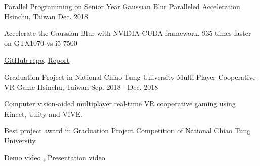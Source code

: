 \begin{cventries}
\cventry
    {Parallel Programming on Senior Year} %
    {Gaussian Blur Paralleled Acceleration} %
    {Hsinchu, Taiwan} %
    {Dec. 2018} %
    {
      \begin{cvitems} %
        \item Accelerate the Gaussian Blur with NVIDIA CUDA framework. 935 times faster on GTX1070 vs i5 7500
        \item \href{https://github.com/Alfons0329/Parallel_Programming_Fall_2018/tree/master/Final\%20Project}{GitHub repo}, \href{https://github.com/Alfons0329/Parallel_Programming_Fall_2018/blob/master/Final\%20Project/Team24_Final_Project_Report.pdf}{Report}
      \end{cvitems}
    }
\cventry
    {Graduation Project in National Chiao Tung University} %
    {Multi-Player Cooperative VR Game} %
    {Hsinchu, Taiwan} %
    {Sep. 2018 - Dec. 2018} %
    {
      \begin{cvitems} %
        \item Computer vision-aided multiplayer real-time VR cooperative gaming using Kinect, Unity and VIVE.
        \item Best project award in Graduation Project Competition of National Chiao Tung University
        \item \href{https://www.youtube.com/watch?v=rYiFose7gZU}{Demo video} \href{https://youtu.be/Kfz1KYMKrtU}{, Presentation video}
      \end{cvitems}
    }
\end{cventries}
